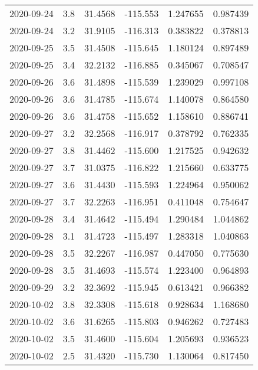 \begin{tabular}{lrrrrr}
2020-09-24 &       3.8 &  31.4568 &  -115.553 &         1.247655 &         0.987439 \\
2020-09-24 &       3.2 &  31.9105 &  -116.313 &         0.383822 &         0.378813 \\
2020-09-25 &       3.5 &  31.4508 &  -115.645 &         1.180124 &         0.897489 \\
2020-09-25 &       3.4 &  32.2132 &  -116.885 &         0.345067 &         0.708547 \\
2020-09-26 &       3.6 &  31.4898 &  -115.539 &         1.239029 &         0.997108 \\
2020-09-26 &       3.6 &  31.4785 &  -115.674 &         1.140078 &         0.864580 \\
2020-09-26 &       3.6 &  31.4758 &  -115.652 &         1.158610 &         0.886741 \\
2020-09-27 &       3.2 &  32.2568 &  -116.917 &         0.378792 &         0.762335 \\
2020-09-27 &       3.8 &  31.4462 &  -115.600 &         1.217525 &         0.942632 \\
2020-09-27 &       3.7 &  31.0375 &  -116.822 &         1.215660 &         0.633775 \\
2020-09-27 &       3.6 &  31.4430 &  -115.593 &         1.224964 &         0.950062 \\
2020-09-27 &       3.7 &  32.2263 &  -116.951 &         0.411048 &         0.754647 \\
2020-09-28 &       3.4 &  31.4642 &  -115.494 &         1.290484 &         1.044862 \\
2020-09-28 &       3.1 &  31.4723 &  -115.497 &         1.283318 &         1.040863 \\
2020-09-28 &       3.5 &  32.2267 &  -116.987 &         0.447050 &         0.775630 \\
2020-09-28 &       3.5 &  31.4693 &  -115.574 &         1.223400 &         0.964893 \\
2020-09-29 &       3.2 &  32.3692 &  -115.945 &         0.613421 &         0.966382 \\
2020-10-02 &       3.8 &  32.3308 &  -115.618 &         0.928634 &         1.168680 \\
2020-10-02 &       3.6 &  31.6265 &  -115.803 &         0.946262 &         0.727483 \\
2020-10-02 &       3.5 &  31.4600 &  -115.604 &         1.205693 &         0.936523 \\
2020-10-02 &       2.5 &  31.4320 &  -115.730 &         1.130064 &         0.817450 \\

\end{tabular}

